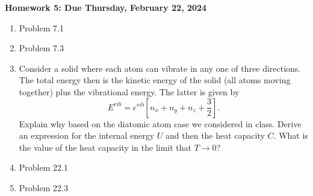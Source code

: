\documentclass[11pt]{article}
\begin{document}
\newcommand{\problem}[1]{%
\item {#1}
}
\newcommand{\probl}[1]{\label{#1}}
\def\be{\begin{equation}}
\def\ee{\end{equation}}
\def\bea{\begin{eqnarray}}
\def\eea{\end{eqnarray}}
\newcommand{\vs}{\nonumber\\}
\def\across{a^\times}
\def\tcross{T^\times}
\def\ccross{C^\times}
\newcommand{\ec}[1]{Eq.~(\ref{eq:#1})}
\newcommand{\eec}[2]{Eqs.~(\ref{eq:#1}) and (\ref{eq:#2})}
\newcommand{\Ec}[1]{(\ref{eq:#1})}
\newcommand{\eql}[1]{\label{eq:#1}}
\newcommand{\sfig}[2]{
\texttt{[image: \#1]}
        }
\newcommand{\sfigr}[2]{
\texttt{[image: \#1]}
        }
\newcommand{\sfigra}[2]{
\texttt{[image: \#1]}
        }
\newcommand{\Sfig}[2]{
   \begin{figure}[thbp]
   \begin{center}
    \sfig{#1.pdf}{0.5\columnwidth}
    \caption{{\small #2}}
    \label{fig:#1}
     \end{center}
   \end{figure}
}

\newcommand\dirac{\delta_D}
\newcommand{\rf}[1]{\ref{fig:#1}}
\newcommand\rhoc{\rho_{\rm cr}}
\newcommand\zs{D_S}
\newcommand\dts{\Delta t_{\rm Sh}}
\newcommand\zle{D_L}
\newcommand\zsl{D_{SL}}
\newcommand\sh{\gamma}
\newcommand\surb{\mathcal{S}}
\newcommand\psf{\mathcal{P}}
\newcommand\spsf{\sigma_{\rm PSF}}
\newcommand\bei{\begin{itemize}}
\newcommand\eei{\end{itemize}}
\begin{centering}
{\bf Homework 5: Due Thursday, February 22, 2024}
\end{centering}

\begin{enumerate}

\problem{Problem 7.1}
\problem{Problem 7.3}
\problem{Consider a solid where each atom can vibrate in any one of three directions. The total energy then is the kinetic energy of the solid (all atoms moving together) plus the vibrational energy. The latter is given by
\be
E^{vib} = \epsilon^{vib} \left[ n_x+n_y+n_z +\frac32\right].\ee
Explain why based on the diatomic atom case we considered in class. Derive an expression for the internal energy $U$ and then the heat capacity $C$. What is the value of the heat capacity in the limit that $T\rightarrow0$? }
\problem{Problem 22.1}
\problem{Problem 22.3}

\end{enumerate}
\end{document}
